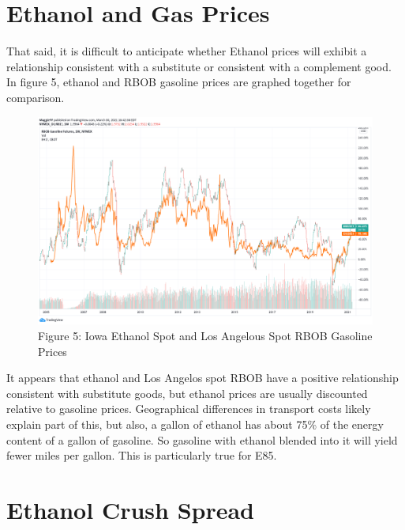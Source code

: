 \documentclass[
  letterpaper,
  DIV=11,
  numbers=noendperiod]{scrreprt}
\begin{document}
\hypertarget{ethanol-and-gas-prices}{%
\section{Ethanol and Gas Prices}\label{ethanol-and-gas-prices}}

That said, it is difficult to anticipate whether Ethanol prices will
exhibit a relationship consistent with a substitute or consistent with a
complement good. In figure 5, ethanol and RBOB gasoline prices are
graphed together for comparison.

\begin{figure}

{\centering \includegraphics{assets/EthRBOB.png}

}

\caption{Figure 5: Iowa Ethanol Spot and Los Angelous Spot RBOB Gasoline
Prices}

\end{figure}

It appears that ethanol and Los Angelos spot RBOB have a positive
relationship consistent with substitute goods, but ethanol prices are
usually discounted relative to gasoline prices. Geographical differences
in transport costs likely explain part of this, but also, a gallon of
ethanol has about 75\% of the energy content of a gallon of gasoline. So
gasoline with ethanol blended into it will yield fewer miles per gallon.
This is particularly true for E85.

\hypertarget{ethanol-crush-spread}{%
\section{Ethanol Crush Spread}\label{ethanol-crush-spread}}
\end{document}
